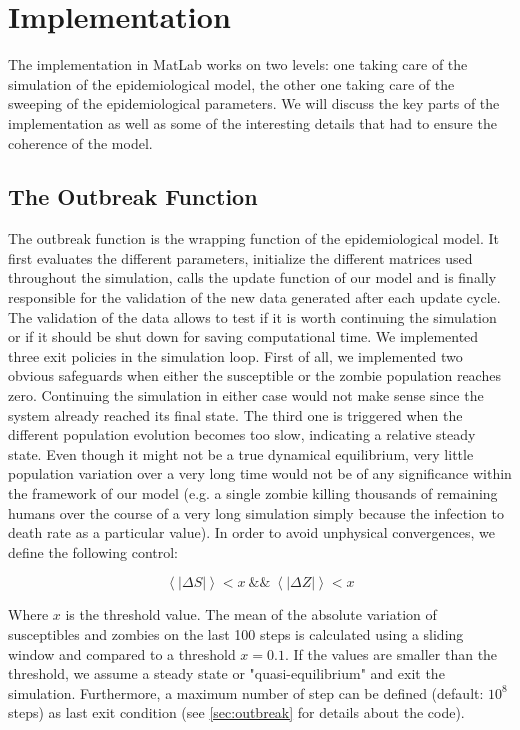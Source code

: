 \documentclass[11pt]{article} %
\begin{document}
\newpage
\section{Implementation}\indent

The implementation in MatLab works on two levels: one taking care of the simulation of the epidemiological model, the other one taking care of the sweeping of the epidemiological parameters. We will discuss the key parts of the implementation as well as some of the interesting details that had to ensure the coherence of the model.


\subsection{The Outbreak Function}\indent
\label{outbreakimpl}

The outbreak function is the wrapping function of the epidemiological model. It first evaluates the different parameters, initialize the different matrices used throughout the simulation, calls the update function of our model and is finally responsible for the validation of the new data generated after each update cycle. The validation of the data allows to test if it is worth continuing the simulation or if it should be shut down for saving computational time. We implemented three exit policies in the simulation loop. First of all, we implemented two obvious safeguards when either the susceptible or the zombie population reaches zero. Continuing the simulation in either case would not make sense since the system already reached its final state. The third one is triggered when the different population evolution becomes too slow, indicating a relative steady state. Even though it might not be a true dynamical equilibrium, very little population variation over a very long time would not be of any significance within the framework of our model (e.g. a single zombie killing thousands of remaining humans over the course of a very long simulation simply because the infection to death rate as a particular value). In order to avoid unphysical convergences, we define the following control:

\bigskip
\begin{equation} \label{eq:outbreakequilibrium}
\left\langle \left| \Delta S \right| \right\rangle < x\ \&\&\ \left\langle\left|\Delta Z \right| \right\rangle < x
\end{equation}
\bigskip

Where $x$ is the threshold value. The mean of the absolute variation of susceptibles and zombies on the last 100 steps is calculated using a sliding window and compared to a threshold $x = 0.1$. If the values are smaller than the threshold, we assume a steady state or "quasi-equilibrium" and exit the simulation. Furthermore, a maximum number of step can be defined (default: $10^8$ steps) as last exit condition (see \ref{sec:outbreak} for details about the code).
\end{document}

